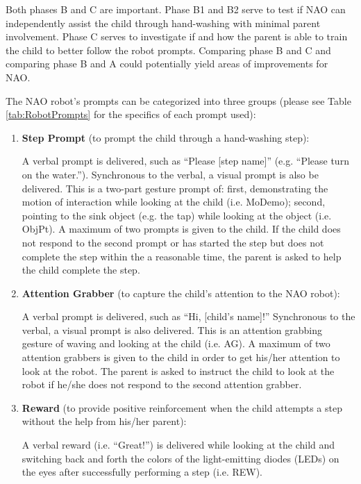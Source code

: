 Both phases B and C are important.  Phase B1 and B2 serve to test if NAO can independently assist the child through hand-washing with minimal parent involvement.  Phase C serves to investigate if  and how the parent is able to train the child to better follow the robot prompts.  Comparing phase B and C and comparing phase B and A could potentially yield areas of improvements for NAO.

The NAO robot's prompts can be categorized into three groups (please see Table \ref{tab:RobotPrompts} for the specifics of each prompt used):
\begin{enumerate}
	\item \textbf{Step Prompt} (to prompt the child through a hand-washing step):
	
	A verbal prompt is delivered, such as “Please [step name]” (e.g. “Please turn on the water.”).  Synchronous to the verbal, a visual prompt is also be delivered. This is a two-part gesture prompt of: first, demonstrating the motion of interaction while looking at the child (i.e. MoDemo); second, pointing to the sink object (e.g. the tap) while looking at the object (i.e. ObjPt). A maximum of two prompts is given to the child. If the child does not respond to the second prompt or has started the step but does not complete the step within the a reasonable time, the parent is asked to help the child complete the step. 
	
	\item \textbf{Attention Grabber} (to capture the child's attention to the NAO robot): 
	
	A verbal prompt is delivered, such as “Hi, [child's name]!”  Synchronous to the verbal, a visual prompt is also delivered. This is an attention grabbing gesture of waving and looking at the child (i.e. AG). A maximum of two attention grabbers is given to the child in order to get his/her attention to look at the robot.  The parent is asked to instruct the child to look at the robot if he/she does not respond to the second attention grabber. 
	
	\item \textbf{Reward} (to provide positive reinforcement when the child attempts a step without the help from his/her parent): 
	
	A verbal reward (i.e. “Great!”) is delivered while looking at the child and switching back and forth the colors of the light-emitting diodes (LEDs) on the eyes after successfully performing a step (i.e. REW).
\end{enumerate}
